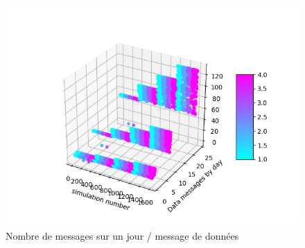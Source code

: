 \begin{figure}[!ht]
\centerline {\includegraphics[scale = 0.5]{graphics_resultats/msg/Sim-MSG_GW-MSG_SEND-degree_GW.png}}
\caption {Nombre de messages sur un jour / message de données}
\end{figure}